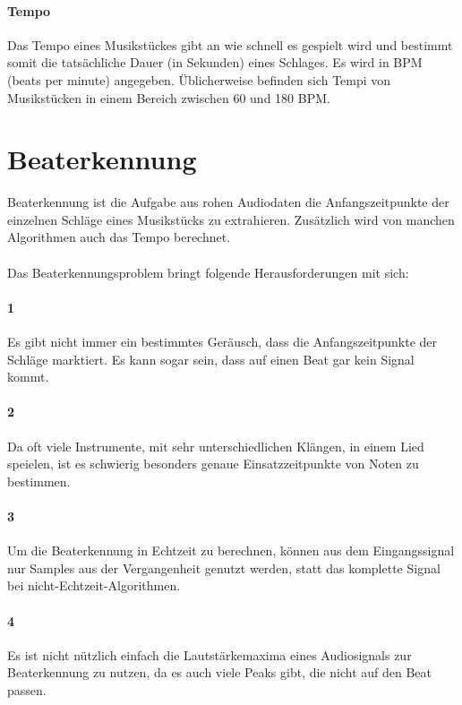 {	\paragraph{Tempo}
	{
		Das Tempo eines Musikstückes gibt an wie schnell es gespielt wird
			und bestimmt somit die tatsächliche Dauer (in Sekunden) eines Schlages.
		Es wird in BPM (beats per minute) angegeben.
		Üblicherweise befinden sich Tempi von Musikstücken in einem Bereich zwischen 60 und 180 BPM.
	}
}

\section{Beaterkennung}
{
	Beaterkennung ist die Aufgabe aus rohen Audiodaten die Anfangszeitpunkte der einzelnen Schläge eines Musikstücks zu extrahieren.
	Zusätzlich wird von manchen Algorithmen auch das Tempo berechnet.

	\paragraph{}
	{
		Das Beaterkennungsproblem bringt folgende Herausforderungen mit sich:
	}

	\paragraph{1} %
	{
		Es gibt nicht immer ein bestimmtes Geräusch,
			dass die Anfangszeitpunkte der Schläge marktiert.
		Es kann sogar sein, dass auf einen Beat gar kein Signal kommt.
	}

	\paragraph{2} %
	{
		Da oft viele Instrumente, mit sehr unterschiedlichen Klängen, in einem Lied speielen,
			ist es schwierig besonders genaue Einsatzzeitpunkte von Noten zu bestimmen.
	}

	\paragraph{3} %
	{
		Um die Beaterkennung in Echtzeit zu berechnen,
			können aus dem Eingangssignal nur Samples aus der Vergangenheit genutzt werden,
			statt das komplette Signal bei nicht-Echtzeit-Algorithmen.
	}

	\paragraph{4} %
	{
		Es ist nicht nützlich einfach die Lautstärkemaxima eines Audiosignals zur Beaterkennung zu nutzen,
			da es auch viele Peaks gibt,
			die nicht auf den Beat passen.
	}

}
